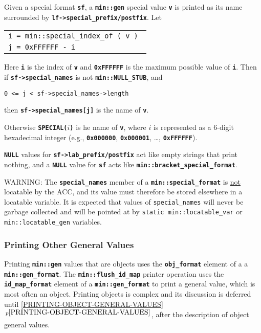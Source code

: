\documentclass[12pt]{article}
\newcommand{\TT}[1]{{\tt \bfseries #1}}
\newcommand{\itemref}[1]{\ref{#1}$\,^{p\pageref{#1}}$}
\newcommand{\EOL}{\penalty \exhyphenpenalty}
\begin{document}
Given a special format \TT{sf},
a \TT{min::gen} special value \TT{v} is printed as its name surrounded
by \TT{lf->\EOL special\_\EOL prefix/\EOL postfix}.
Let
\begin{center}
\begin{tabular}{l}
\tt i = min::special\_index\_of ( v ) \\
\tt j = 0xFFFFFF - i
\end{tabular}
\end{center}
Here \TT{i} is the index of \TT{v} and \TT{0xFFFFFF} is the maximum possible
value of \TT{i}.
Then if \TT{sf->\EOL special\_\EOL names} is not \TT{min::\EOL NULL\_\EOL STUB},
and
\begin{center}
\tt 0 <= j < sf->special\_names->length
\end{center}
then \TT{sf->\EOL special\_\EOL names[j]} is the name of \TT{v}.

Otherwise
\TT{SPECIAL(}$i$\TT{)} is he name of \TT{v}, where $i$ is represented as
a 6-digit hexadecimal integer (e.g., \TT{0x000000}, \TT{0x000001},
\ldots, \TT{0xFFFFFF}).

\TT{NULL} values for
\TT{sf->\EOL lab\_\EOL prefix/postfix} act like empty strings
that print nothing, and a \TT{NULL} value for \TT{sf} acts like
\TT{min::\EOL bracket\_\EOL special\_\EOL format}.

WARNING: The \TT{special\_\EOL names} member of a \TT{min::special\_format} is
\underline{not} locatable by the ACC, and its value must therefore be
stored elsewhere in a locatable variable.  It is expected that values of
{\tt special\_\EOL names} will never be garbage collected and
will be pointed at by {\tt static min::\EOL locatable\_\EOL var} or
{\tt min::\EOL locatable\_\EOL gen} variables.

\subsubsection{Printing Other General Values}
\label{PRINTING-OTHER-GENERAL-VALUES}

Printing \TT{min::gen} values that are objects
uses the \TT{obj\_\EOL format} element of a
a \TT{min::\EOL gen\_\EOL format}.
The \TT{min::\EOL flush\_\EOL id\_\EOL map} printer operation uses
the \TT{id\_\EOL map\_\EOL format} element of a \TT{min::\EOL gen\_\EOL format}
to print a general value, which is most often an object.
Printing objects is complex and
its discussion is deferred until \itemref{PRINTING-OBJECT-GENERAL-VALUES},
after the description of object general values.
\end{document}

